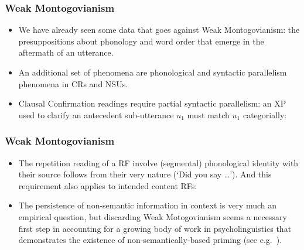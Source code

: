 \documentclass{beamer}
\begin{document}
\begin{frame}
\frametitle{Weak
  Montogovianism }

\begin{itemize}


\item We have already seen some data that goes against {\sf Weak
  Montogovianism}: the presuppositions about phonology and word order
that emerge in the aftermath of an utterance.

\item  An additional set of
phenomena are phonological and syntactic parallelism phenomena in CRs
and NSUs. 
\item Clausal Confirmation readings require
partial syntactic parallelism: an XP used to clarify an antecedent
sub-utterance $u_1$ must match $u_1$ categorially:




\end{itemize}

\end{frame}
\begin{frame}
\frametitle{Weak
  Montogovianism }

\begin{itemize}


\item The repetition reading of a RF involve (segmental) phonological 
identity with their source follows from their very nature (`Did you
say \ldots'). And this requirement also applies to
intended content  RFs: 



\item The persistence of non-semantic information in context is
 very much an empirical question, but discarding {\sf Weak
   Motogovianism} seems a necessary first step in accounting for a
 growing body of work in psycholinguistics that demonstrates the
 existence of non-semantically-based priming (see
 e.g.\ \cite{branigan00,garrodpickering04}).




\end{itemize}

\end{frame}
\end{document}
